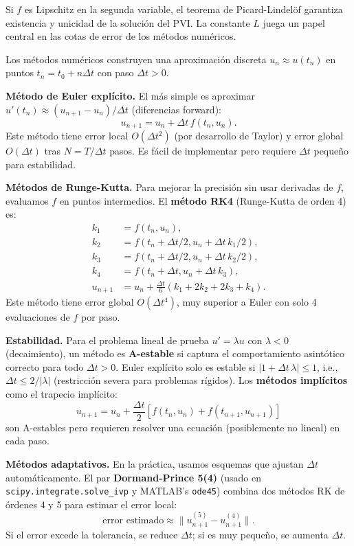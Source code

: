 \documentclass[a4paper,11pt]{report}
\begin{document}
Si $f$ es Lipschitz en la segunda variable, el teorema de Picard-Lindelöf garantiza existencia y unicidad de la solución del PVI. La constante $L$ juega un papel central en las cotas de error de los métodos numéricos.

Los métodos numéricos construyen una aproximación discreta $u_n \approx u(t_n)$ en puntos $t_n = t_0 + n\Delta t$ con paso $\Delta t > 0$.

\textbf{Método de Euler explícito.} El más simple es aproximar $u'(t_n) \approx (u_{n+1} - u_n)/\Delta t$ (diferencias forward):
\[
u_{n+1} = u_n + \Delta t\, f(t_n, u_n).
\]
Este método tiene error local $O(\Delta t^2)$ (por desarrollo de Taylor) y error global $O(\Delta t)$ tras $N = T/\Delta t$ pasos. Es fácil de implementar pero requiere $\Delta t$ pequeño para estabilidad.

\textbf{Métodos de Runge-Kutta.} Para mejorar la precisión sin usar derivadas de $f$, evaluamos $f$ en puntos intermedios. El \textbf{método RK4} (Runge-Kutta de orden 4) es:
\begin{align*}
k_1 &= f(t_n, u_n), \\
k_2 &= f(t_n + \Delta t/2, u_n + \Delta t\,k_1/2), \\
k_3 &= f(t_n + \Delta t/2, u_n + \Delta t\,k_2/2), \\
k_4 &= f(t_n + \Delta t, u_n + \Delta t\,k_3), \\
u_{n+1} &= u_n + \frac{\Delta t}{6}(k_1 + 2k_2 + 2k_3 + k_4).
\end{align*}
Este método tiene error global $O(\Delta t^4)$, muy superior a Euler con solo 4 evaluaciones de $f$ por paso.

\textbf{Estabilidad.} Para el problema lineal de prueba $u' = \lambda u$ con $\lambda < 0$ (decaimiento), un método es \textbf{A-estable} si captura el comportamiento asintótico correcto para todo $\Delta t > 0$. Euler explícito solo es estable si $|1 + \Delta t\,\lambda| \leq 1$, i.e., $\Delta t \leq 2/|\lambda|$ (restricción severa para problemas rígidos). Los \textbf{métodos implícitos} como el trapecio implícito:
\[
u_{n+1} = u_n + \frac{\Delta t}{2}[f(t_n, u_n) + f(t_{n+1}, u_{n+1})]
\]
son A-estables pero requieren resolver una ecuación (posiblemente no lineal) en cada paso.

\textbf{Métodos adaptativos.} En la práctica, usamos esquemas que ajustan $\Delta t$ automáticamente. El par \textbf{Dormand-Prince 5(4)} (usado en \texttt{scipy.integrate.solve\_ivp} y MATLAB's \texttt{ode45}) combina dos métodos RK de órdenes 4 y 5 para estimar el error local:
\[
\text{error estimado} \approx \|u_{n+1}^{(5)} - u_{n+1}^{(4)}\|.
\]
Si el error excede la tolerancia, se reduce $\Delta t$; si es muy pequeño, se aumenta $\Delta t$.
\end{document}
